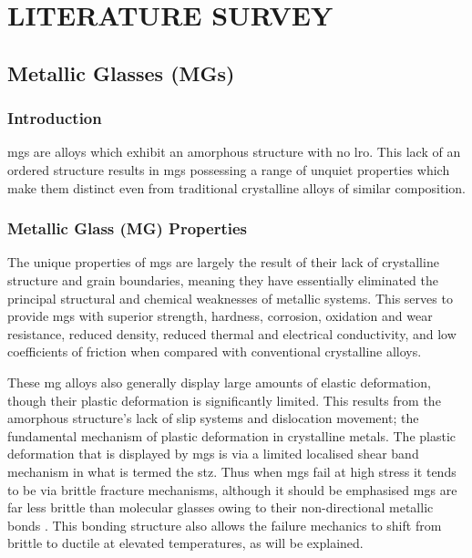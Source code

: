 \documentclass[a4paper,12pt,oneside]{report}%
\begin{document}

\chapter{LITERATURE SURVEY} 
\glsresetall
{}
\section{Metallic Glasses (MGs)}
\subsection{Introduction}
\Glspl{mg} are alloys which exhibit an amorphous structure with no \gls{lro}. This lack of an ordered structure results in \glspl{mg} possessing a range of unquiet properties which make them distinct even from traditional crystalline alloys of similar composition.

\subsection{Metallic Glass (MG) Properties}
The unique properties of \glspl{mg} are largely the result of their lack of crystalline structure and grain boundaries, meaning they have essentially eliminated the principal structural and chemical weaknesses of metallic systems. This serves to provide \glspl{mg} with superior strength, hardness, corrosion, oxidation and wear resistance, reduced density, reduced thermal and electrical conductivity, and low coefficients of friction when compared with conventional crystalline alloys. 
 
These \gls{mg} alloys also generally display large amounts of elastic deformation, though their plastic deformation is significantly limited. This results from the amorphous structure's lack of slip systems and dislocation movement; the fundamental mechanism of plastic deformation in crystalline metals. The plastic deformation that is displayed by \glspl{mg} is via a limited localised shear band mechanism in what is termed the \gls{stz}.  Thus when \glspl{mg} fail at high stress it tends to be via brittle fracture mechanisms, although it should be emphasised \glspl{mg} are far less brittle than molecular glasses owing to their non-directional metallic bonds \cite{Greer2013}. This bonding structure also allows the failure mechanics to shift from brittle to ductile at elevated temperatures, as will be explained.
\end{document}
